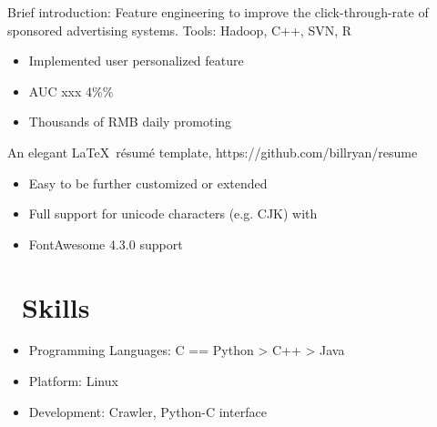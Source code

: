 \documentclass{resume}
\begin{document}
Brief introduction: Feature engineering to improve the click-through-rate of sponsored advertising systems. Tools: Hadoop, C++, SVN, R
\begin{itemize}
  \item Implemented user personalized feature
  \item AUC xxx 4\%\%
  \item Thousands of RMB daily promoting 
\end{itemize}

An elegant \LaTeX\ résumé template, https://github.com/billryan/resume
\begin{itemize}
  \item Easy to be further customized or extended
  \item Full support for unicode characters (e.g. CJK) with \XeLaTeX\
  \item FontAwesome 4.3.0 support
\end{itemize}


\section{\faCogs\ Skills}
\begin{itemize}[parsep=0.5ex]
  \item Programming Languages: C == Python > C++ > Java
  \item Platform: Linux
  \item Development: Crawler, Python-C interface
\end{itemize}
\end{document}
